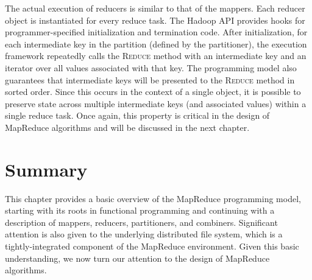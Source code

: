 The actual execution of reducers is similar to that of the mappers.
Each reducer object is instantiated for every reduce task.  The Hadoop
API provides hooks for programmer-specified initialization and
termination code.  After initialization, for each intermediate key in
the partition (defined by the partitioner), the execution framework
repeatedly calls the \textsc{Reduce} method with an intermediate key
and an iterator over all values associated with that key.  The
programming model also guarantees that intermediate keys will be
presented to the \textsc{Reduce} method in sorted order.  Since this
occurs in the context of a single object, it is possible to preserve
state across multiple intermediate keys (and associated values) within
a single reduce task.  Once again, this property is critical in the
design of MapReduce algorithms and will be discussed in the next
chapter.

\section{Summary}
\label{chapter2:summary}

This chapter provides a basic overview of the MapReduce programming
model, starting with its roots in functional programming and
continuing with a description of mappers, reducers, partitioners, and
combiners.  Significant attention is also given to the underlying
distributed file system, which is a tightly-integrated component of
the MapReduce environment.  Given this basic understanding, we now
turn our attention to the design of MapReduce algorithms.
